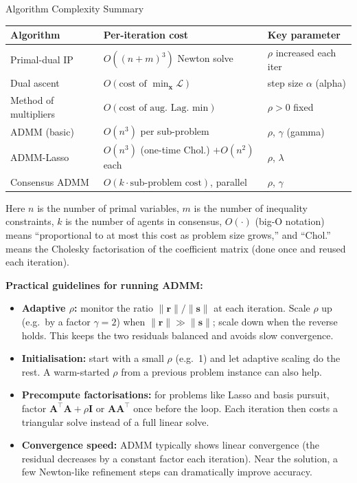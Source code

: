 \documentclass[aspectratio=169,10pt]{beamer}
\newcommand{\bx}{\mathbf{x}}
\newcommand{\bA}{\mathbf{A}}
\newcommand{\bI}{\mathbf{I}}
\newcommand{\calL}{\mathcal{L}}
\begin{document}
\begin{frame}[allowframebreaks]{Algorithm Complexity Summary}

  \begin{center}
  \renewcommand{\arraystretch}{1.3}
  \begin{tabular}{lll}
    \toprule
    Algorithm & Per-iteration cost & Key parameter \\
    \midrule
    Primal-dual IP & $O((n+m)^3)$ Newton solve & $\rho$ increased each iter \\
    Dual ascent & $O(\text{cost of } \min_\bx\calL)$ & step size $\alpha$ (alpha) \\
    Method of multipliers & $O(\text{cost of aug.\ Lag.\ min})$ & $\rho > 0$ fixed \\
    ADMM (basic) & $O(n^3)$ per sub-problem & $\rho$, $\gamma$ (gamma) \\
    ADMM-Lasso & $O(n^3)$ (one-time Chol.) $+ O(n^2)$ each & $\rho$, $\lambda$ \\
    Consensus ADMM & $O(k \cdot \text{sub-problem cost})$, parallel & $\rho$, $\gamma$ \\
    \bottomrule
  \end{tabular}
  \end{center}

  Here $n$ is the number of primal variables, $m$ is the number of
  inequality constraints, $k$ is the number of agents in consensus,
  $O(\cdot)$ (big-O notation) means ``proportional to at most this cost
  as problem size grows,'' and ``Chol.'' means the Cholesky factorisation
  of the coefficient matrix (done once and reused each iteration).

  \medskip
  \textbf{Practical guidelines for running ADMM:}

  \begin{itemize}
    \item \textbf{Adaptive $\rho$:} monitor the ratio
          $\|\mathbf{r}\| / \|\mathbf{s}\|$ at each iteration.  Scale
          $\rho$ up (e.g.\ by a factor $\gamma = 2$) when
          $\|\mathbf{r}\| \gg \|\mathbf{s}\|$; scale down when the
          reverse holds.  This keeps the two residuals balanced and
          avoids slow convergence.
    \item \textbf{Initialisation:} start with a small $\rho$ (e.g.\ 1)
          and let adaptive scaling do the rest.  A warm-started $\rho$
          from a previous problem instance can also help.
    \item \textbf{Precompute factorisations:} for problems like Lasso
          and basis pursuit, factor $\bA^\top\bA + \rho\bI$ or
          $\bA\bA^\top$ once before the loop.  Each iteration then
          costs a triangular solve instead of a full linear solve.
    \item \textbf{Convergence speed:} ADMM typically shows linear
          convergence (the residual decreases by a constant factor each
          iteration).  Near the solution, a few Newton-like refinement
          steps can dramatically improve accuracy.
  \end{itemize}

\end{frame}
\end{document}
